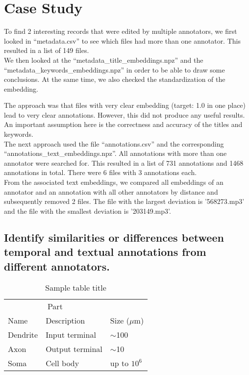 
\section{Case Study}
\label{sec:Case Study}

To find 2 interesting records that were edited by multiple annotators, 
we first looked in ``metadata.csv'' to see which files had more than one annotator. 
This resulted in a list of 149 files. \\
We then looked at the ``metadata\_title\_embeddings.npz'' and the ``metadata\_keywords\_embeddings.npz'' in order 
to be able to draw some conclusions. 
At the same time, we also checked the standardization of the embedding. 

The approach was that files with very clear embedding (target: 1.0 in one place) lead to very clear annotations. 
However, this did not produce any useful results. \\

An important assumption here is the correctness and accuracy of the titles and keywords. \\

The next approach used the file ``annotations.csv'' and the corresponding ``annotations\_text\_embeddings.npz''. 
All annotations with more than one annotator were searched for. 
This resulted in a list of 731 annotations and 1468 annotations in total. There were 6 files with 3 annotations each. \\

From the associated text embeddings, we compared all embeddings of an annotator and an annotation with all other annotators by distance and subsequently removed 2 files.
The file with the largest deviation is '568273.mp3' and the file with the smallest deviation is '203149.mp3'.


\subsection{Identify similarities or differences between temporal and textual annotations from different annotators.}
\label{sec:Case Study:a}



\begin{table}
  \caption{Sample table title}
  \label{tab:example}
  \centering
  \begin{tabular}{lll}
    \toprule
    \multicolumn{2}{c}{Part}                   \\
    \cmidrule(r){1-2}
    Name     & Description     & Size ($\mu$m) \\
    \midrule
    Dendrite & Input terminal  & $\sim$100     \\
    Axon     & Output terminal & $\sim$10      \\
    Soma     & Cell body       & up to $10^6$  \\
    \bottomrule
  \end{tabular}
\end{table}



